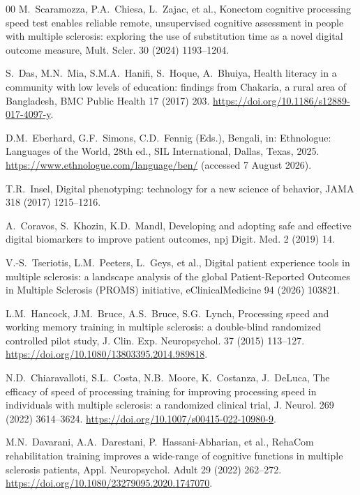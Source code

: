 \documentclass[preprint,12pt,a4paper]{elsarticle}
\begin{document}
\begin{thebibliography}{00}
M.~Scaramozza, P.A.~Chiesa, L.~Zajac, et al.,
Konectom cognitive processing speed test enables reliable remote,
unsupervised cognitive assessment in people with multiple sclerosis:
exploring the use of substitution time as a novel digital outcome measure,
Mult. Scler. 30 (2024) 1193--1204.

S.~Das, M.N.~Mia, S.M.A.~Hanifi, S.~Hoque, A.~Bhuiya,
Health literacy in a community with low levels of education: findings from
Chakaria, a rural area of Bangladesh,
BMC Public Health 17 (2017) 203.
\url{https://doi.org/10.1186/s12889-017-4097-y}.

D.M.~Eberhard, G.F.~Simons, C.D.~Fennig (Eds.),
Bengali, in: Ethnologue: Languages of the World, 28th ed.,
SIL International, Dallas, Texas, 2025.
\url{https://www.ethnologue.com/language/ben/}
(accessed 7 August 2026).



T.R.~Insel,
Digital phenotyping: technology for a new science of behavior,
JAMA 318 (2017) 1215--1216.

A.~Coravos, S.~Khozin, K.D.~Mandl,
Developing and adopting safe and effective digital biomarkers to improve
patient outcomes,
npj Digit. Med. 2 (2019) 14.

V.-S.~Tseriotis, L.M.~Peeters, L.~Geys, et al.,
Digital patient experience tools in multiple sclerosis: a landscape analysis
of the global Patient-Reported Outcomes in Multiple Sclerosis (PROMS)
initiative,
eClinicalMedicine 94 (2026) 103821.

L.M.~Hancock, J.M.~Bruce, A.S.~Bruce, S.G.~Lynch,
Processing speed and working memory training in multiple sclerosis:
a double-blind randomized controlled pilot study,
J. Clin. Exp. Neuropsychol. 37 (2015) 113--127.
\url{https://doi.org/10.1080/13803395.2014.989818}.

N.D.~Chiaravalloti, S.L.~Costa, N.B.~Moore, K.~Costanza, J.~DeLuca,
The efficacy of speed of processing training for improving processing
speed in individuals with multiple sclerosis: a randomized clinical trial,
J. Neurol. 269 (2022) 3614--3624.
\url{https://doi.org/10.1007/s00415-022-10980-9}.

M.N.~Davarani, A.A.~Darestani, P.~Hassani-Abharian, et al.,
RehaCom rehabilitation training improves a wide-range of cognitive
functions in multiple sclerosis patients,
Appl. Neuropsychol. Adult 29 (2022) 262--272.
\url{https://doi.org/10.1080/23279095.2020.1747070}.

\end{thebibliography}
\end{document}
